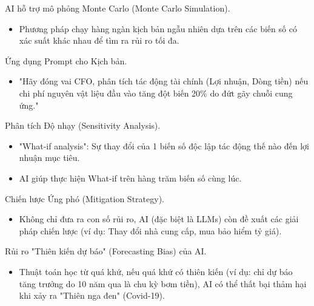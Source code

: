 \documentclass[aspectratio=169]{beamer}
\begin{document}
\begin{frame}{AI hỗ trợ mô phỏng Monte Carlo (Monte Carlo Simulation).}
    \begin{itemize}
        \item Phương pháp chạy hàng ngàn kịch bản ngẫu nhiên dựa trên các biến số có xác suất khác nhau để tìm ra rủi ro tối đa.
    \end{itemize}
\end{frame}


\begin{frame}{Ứng dụng Prompt cho Kịch bản.}
    \begin{itemize}
        \item "Hãy đóng vai CFO, phân tích tác động tài chính (Lợi nhuận, Dòng tiền) nếu chi phí nguyên vật liệu đầu vào tăng đột biến 20\% do đứt gãy chuỗi cung ứng."
    \end{itemize}
\end{frame}


\begin{frame}{Phân tích Độ nhạy (Sensitivity Analysis).}
    \begin{itemize}
        \item "What-if analysis": Sự thay đổi của 1 biến số độc lập tác động thế nào đến lợi nhuận mục tiêu.
        \item AI giúp thực hiện What-if trên hàng trăm biến số cùng lúc.
    \end{itemize}
\end{frame}


\begin{frame}{Chiến lược Ứng phó (Mitigation Strategy).}
    \begin{itemize}
        \item Không chỉ đưa ra con số rủi ro, AI (đặc biệt là LLMs) còn đề xuất các giải pháp chiến lược (ví dụ: Thay đổi nhà cung cấp, mua bảo hiểm tỷ giá).
    \end{itemize}
\end{frame}


\begin{frame}{Rủi ro "Thiên kiến dự báo" (Forecasting Bias) của AI.}
    \begin{itemize}
        \item Thuật toán học từ quá khứ, nếu quá khứ có thiên kiến (ví dụ: chỉ dự báo tăng trưởng do 10 năm qua là chu kỳ bơm tiền), AI có thể thất bại thảm hại khi xảy ra "Thiên nga đen" (Covid-19).
    \end{itemize}
\end{frame}
\end{document}
